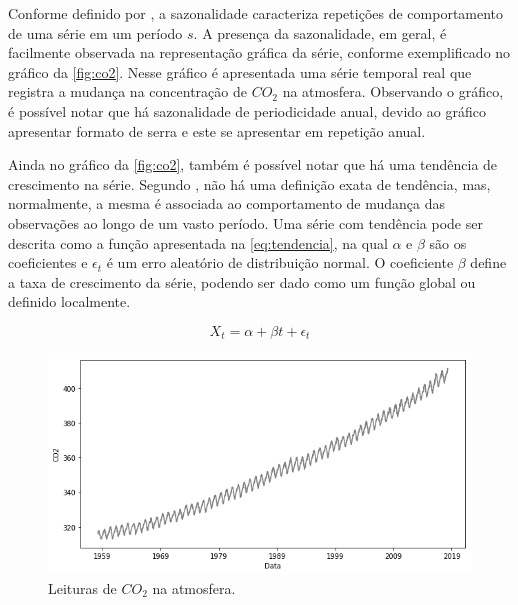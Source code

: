 \documentclass[
    12pt,
    oneside,
    a4paper,
    english,
    brazil
]{abntex2}
\begin{document}
Conforme   definido  por   ,   a  sazonalidade   caracteriza
repetições  de comportamento  de uma  série em  um período  $s$. A  presença da
sazonalidade,  em geral,  é facilmente  observada na  representação gráfica  da
série, conforme exemplificado no gráfico  da \autoref{fig:co2}. Nesse gráfico é
apresentada uma série  temporal real que registra a mudança  na concentração de
$CO_2$ na atmosfera. Observando o gráfico, é possível notar que há sazonalidade
de periodicidade anual, devido ao gráfico apresentar formato de serra e este se
apresentar em repetição anual.

Ainda  no  gráfico  da  \autoref{fig:co2},  também  é  possível  notar  que  há
uma  tendência de  crescimento na  série. Segundo  , não  há
uma  definição exata  de  tendência, mas, normalmente, a  mesma é associada  ao
comportamento  de  mudança  das  observações  ao longo  de  um  vasto  período.
Uma  série  com tendência  pode  ser  descrita  como  a função  apresentada  na
\autoref{eq:tendencia},  na  qual $\alpha$  e  $\beta$  são os  coeficientes  e
$\epsilon_t$ é um erro aleatório  de distribuição normal. O coeficiente $\beta$
define a taxa de  crescimento da série, podendo ser dado  como um função global
ou definido localmente.

\begin{equation}
    \label{eq:tendencia} X_t = \alpha + \beta{}t + \epsilon_t
\end{equation}


\begin{figure}[ht]
    \centering
    \caption{Leituras de $CO_2$ na atmosfera.}\label{fig:co2}
    \includegraphics[width=.5\linewidth]{images/co2.png}
\end{figure}
\end{document}
